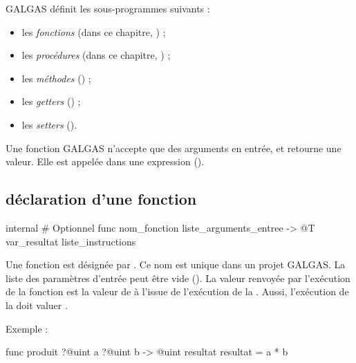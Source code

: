

GALGAS définit les sous-programmes suivants :
\begin{itemize}
  \item les \emph{fonctions} (dans ce chapitre, ) ;
  \item les \emph{procédures} (dans ce chapitre, ) ;
  \item les \emph{méthodes} () ;
  \item les \emph{getters} () ;
  \item les \emph{setters} ().
\end{itemize}


Une fonction GALGAS n'accepte que des arguments en entrée, et retourne une valeur. Elle est appelée dans une expression ().

\subsection{déclaration d'une fonction}

\begin{galgascode}
internal # Optionnel
func nom_fonction liste_arguments_entree -> @T var_resultat {
  liste_instructions
}
\end{galgascode}

Une fonction est désignée par . Ce nom est unique dans un projet GALGAS. La liste des paramètres d'entrée peut être vide (). La valeur renvoyée par l'exécution de la fonction est la valeur de  à l'issue de l'exécution de la . Aussi, l'exécution de la  doit valuer .

Exemple :

\begin{galgascode}
func produit ?@uint a ?@uint b -> @uint resultat {
  resultat = a * b
}
\end{galgascode}



